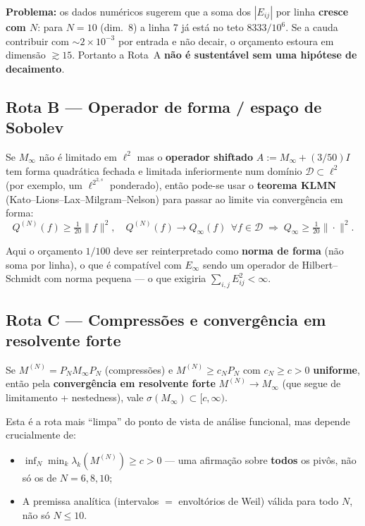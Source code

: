 \documentclass[11pt,a4paper]{article}
\theoremstyle{definition}
\theoremstyle{remark}
\newcommand{\lII}{\ell^2}
\newcommand{\qform}{Q}
\newcommand{\D}{\mathcal{D}}
\begin{document}
\textbf{Problema:} os dados numéricos sugerem que a soma dos \(|E_{ij}|\) por
linha \textbf{cresce com \(N\)}: para \(N=10\) (dim.\ 8) a linha 7 já está no
teto \(8333/10^6\). Se a cauda contribuir com \(\sim 2\times 10^{-3}\) por
entrada e não decair, o orçamento estoura em dimensão \(\gtrsim 15\).
Portanto a Rota~A \textbf{não é sustentável sem uma hipótese de decaimento}.

\subsection{Rota B --- Operador de forma / espaço de Sobolev}

Se \(M_\infty\) não é limitado em \(\lII\) mas o \textbf{operador shiftado}
\(A := M_\infty + (3/50)I\) tem forma quadrática fechada e limitada
inferiormente num domínio \(\D\subset\lII\) (por exemplo, um \(\lII^{2,s}\)
ponderado), então pode-se usar o \textbf{teorema KLMN}
(Kato--Lions--Lax--Milgram--Nelson) para passar ao limite via convergência em
forma:
\[
\qform^{(N)}(f)\ge \tfrac{1}{20}\|f\|^2,\quad
\qform^{(N)}(f)\to \qform_\infty(f)\ \ \forall f\in\D
\;\Longrightarrow\;
\qform_\infty \ge \tfrac{1}{20}\|\cdot\|^2.
\]

Aqui o orçamento \(1/100\) deve ser reinterpretado como \textbf{norma de forma}
(não soma por linha), o que é compatível com \(E_\infty\) sendo um operador de
Hilbert--Schmidt com norma pequena --- o que exigiria
\(\sum_{i,j}E_{ij}^2 < \infty\).

\subsection{Rota C --- Compressões e convergência em resolvente forte}

Se \(M^{(N)} = P_N M_\infty P_N\) (compressões) e \(M^{(N)}\ge c_N P_N\) com
\(c_N\ge c>0\) \textbf{uniforme}, então pela \textbf{convergência em
resolvente forte} \(M^{(N)}\to M_\infty\) (que segue de limitamento +
nestedness), vale \(\sigma(M_\infty)\subset[c,\infty)\).

Esta é a rota mais ``limpa'' do ponto de vista de análise funcional, mas
depende crucialmente de:
\begin{itemize}
  \item \(\inf_N \min_k \lambda_k(M^{(N)}) \ge c > 0\) --- uma afirmação sobre
        \textbf{todos} os pivôs, não só os de \(N=6,8,10\);
  \item A premissa analítica (intervalos $=$ envoltórios de Weil) válida para
        todo \(N\), não só \(N\le 10\).
\end{itemize}
\end{document}
